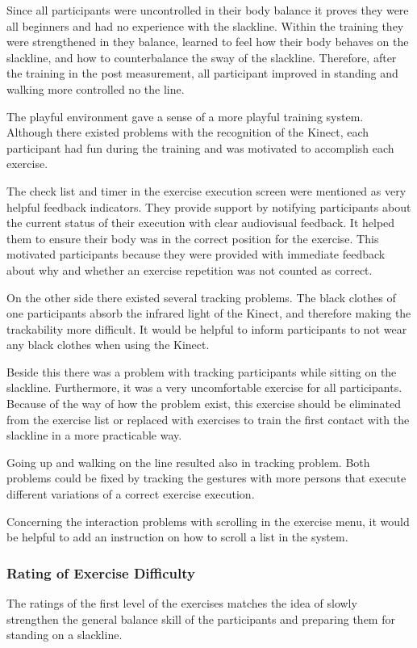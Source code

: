 Since all participants were uncontrolled in their body balance it proves they were all beginners and had no experience with the slackline.
Within the training they were strengthened in they balance, learned to feel how their body behaves on the slackline, and how to counterbalance the sway of the slackline.
Therefore, after the training in the post measurement, all participant improved in standing and walking more controlled no the line.

The playful environment gave a sense of a more playful training system.
Although there existed problems with the recognition of the Kinect, each participant had fun during the training and was motivated to accomplish each exercise.

The check list and timer in the exercise execution screen were mentioned as very helpful feedback indicators.
They provide support by notifying participants about the current status of their execution with clear audiovisual feedback.
It helped them to ensure their body was in the correct position for the exercise.
This motivated participants because they were provided with immediate feedback about why and whether an exercise repetition was not counted as correct.

On the other side there existed several tracking problems.
The black clothes of one participants absorb the infrared light of the Kinect, and therefore making the trackability more difficult.
It would be helpful to inform participants to not wear any black clothes when using the Kinect.

Beside this there was a problem with tracking participants while sitting on the slackline.
Furthermore, it was a very uncomfortable exercise for all participants.
Because of the way of how the problem exist, this exercise should be eliminated from the exercise list or replaced with exercises to train the first contact with the slackline in a more practicable way.

Going up and walking on the line resulted also in tracking problem.
Both problems could be fixed by tracking the gestures with more persons that execute different variations of a correct exercise execution.

Concerning the interaction problems with scrolling in the exercise menu, it would be helpful to add an instruction on how to scroll a list in the system.

\subsubsection{Rating of Exercise Difficulty}
The ratings of the first level of the exercises matches the idea of slowly strengthen the general balance skill of the participants and preparing them for standing on a slackline.

